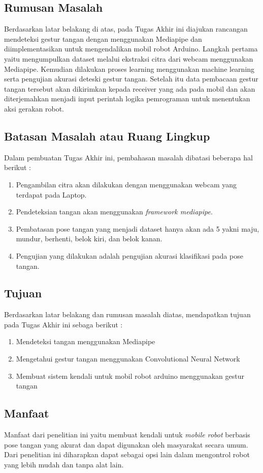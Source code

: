\subsection{Rumusan Masalah}
Berdasarkan latar belakang di atas, pada Tugas Akhir ini diajukan rancangan mendeteksi gestur tangan dengan menggunakan Mediapipe dan diimplementasikan untuk mengendalikan mobil robot Arduino. Langkah pertama yaitu mengumpulkan dataset melalui ekstraksi citra dari webcam menggunakan Mediapipe. Kemudian dilakukan proses learning menggunakan machine learning serta pengujian akurasi deteski gestur tangan. Setelah itu data pembacaan gestur tangan tersebut akan dikirimkan kepada receiver yang ada pada mobil dan akan diterjemahkan menjadi input perintah logika pemrograman untuk menentukan aksi gerakan robot.

\subsection{Batasan Masalah atau Ruang Lingkup}

Dalam pembuatan Tugas Akhir ini, pembahasan masalah dibatasi beberapa hal berikut :
\begin{enumerate}
	\item Pengambilan citra akan dilakukan dengan menggunakan webcam yang terdapat pada Laptop.
	\item Pendeteksian tangan akan menggunakan \textit{framework mediapipe}.
	\item Pembatasan pose tangan yang menjadi dataset hanya akan ada 5 yakni maju, mundur, berhenti, belok kiri, dan belok kanan.
	\item Pengujian yang dilakukan adalah pengujian akurasi klasifikasi pada pose tangan.
\end{enumerate}

\subsection{Tujuan}

Berdasarkan latar belakang dan rumusan masalah diatas, mendapatkan tujuan pada Tugas Akhir ini sebaga berikut :
\begin{enumerate}
	\item Mendeteksi tangan menggunakan Mediapipe
	\item Mengetahui gestur tangan menggunakan Convolutional Neural Network
	\item Membuat sistem kendali untuk mobil robot arduino menggunakan gestur tangan
\end{enumerate}

\subsection{Manfaat}
Manfaat dari penelitian ini yaitu membuat kendali untuk \textit{mobile robot} berbasis pose tangan yang akurat dan dapat digunakan oleh masyarakat secara umum. Dari penelitian ini diharapkan dapat sebagai opsi lain dalam mengontrol robot yang lebih mudah dan tanpa alat lain.
